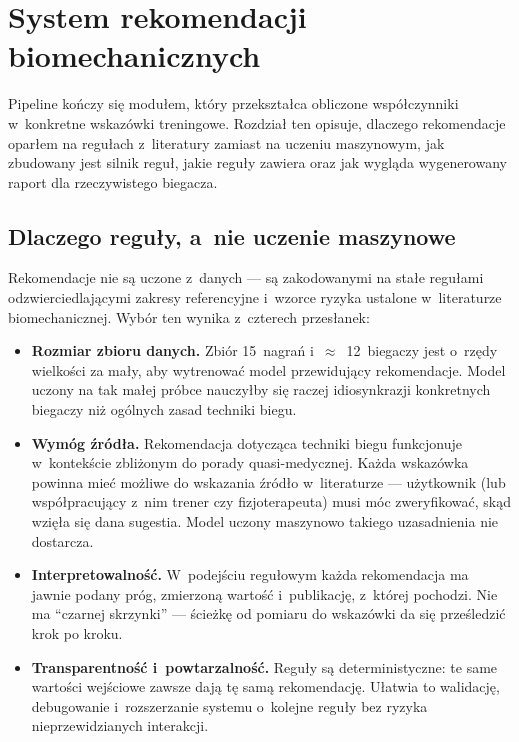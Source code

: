 \chapter{System rekomendacji biomechanicznych}
\label{ch:rekomendacje}

Pipeline kończy się modułem, który przekształca obliczone współczynniki w~konkretne wskazówki treningowe. Rozdział ten opisuje, dlaczego rekomendacje oparłem na regułach z~literatury zamiast na uczeniu maszynowym, jak zbudowany jest silnik reguł, jakie reguły zawiera oraz jak wygląda wygenerowany raport dla rzeczywistego biegacza.

\section{Dlaczego reguły, a~nie uczenie maszynowe}
\label{sec:rule-based-vs-ml}

Rekomendacje nie są uczone z~danych --- są zakodowanymi na stałe regułami odzwierciedlającymi zakresy referencyjne i~wzorce ryzyka ustalone w~literaturze biomechanicznej. Wybór ten wynika z~czterech przesłanek:

\begin{itemize}
    \item \textbf{Rozmiar zbioru danych.} Zbiór 15~nagrań i~$\approx$~12~biegaczy jest o~rzędy wielkości za mały, aby wytrenować model przewidujący rekomendacje. Model uczony na tak małej próbce nauczyłby się raczej idiosynkrazji konkretnych biegaczy niż ogólnych zasad techniki biegu.
    \item \textbf{Wymóg źródła.} Rekomendacja dotycząca techniki biegu funkcjonuje w~kontekście zbliżonym do porady quasi-medycznej. Każda wskazówka powinna mieć możliwe do wskazania źródło w~literaturze --- użytkownik (lub współpracujący z~nim trener czy fizjoterapeuta) musi móc zweryfikować, skąd wzięła się dana sugestia. Model uczony maszynowo takiego uzasadnienia nie dostarcza.
    \item \textbf{Interpretowalność.} W~podejściu regułowym każda rekomendacja ma jawnie podany próg, zmierzoną wartość i~publikację, z~której pochodzi. Nie ma ``czarnej skrzynki'' --- ścieżkę od pomiaru do wskazówki da się prześledzić krok po kroku.
    \item \textbf{Transparentność i~powtarzalność.} Reguły są deterministyczne: te same wartości wejściowe zawsze dają tę samą rekomendację. Ułatwia to walidację, debugowanie i~rozszerzanie systemu o~kolejne reguły bez ryzyka nieprzewidzianych interakcji.
\end{itemize}

